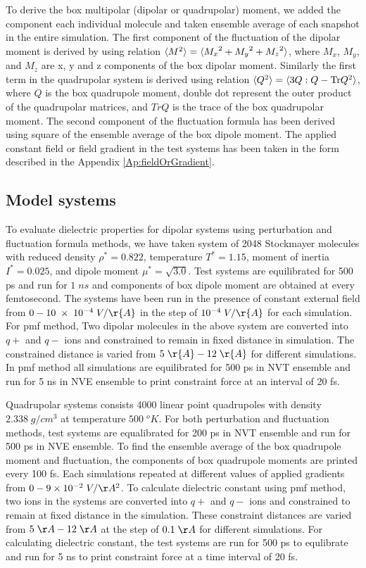 To derive the box multipolar (dipolar or quadrupolar) moment, we added the component each individual molecule and taken ensemble average of each snapshot in the entire simulation. The first component of the fluctuation of the dipolar moment is derived by using relation $\braket{M^2} = \braket{{M_x}^2 + {M_y}^2 + {M_z}^2}$, where $M_x$, $M_y$, and $M_z $ are x, y and z components of the box dipolar moment. Similarly the first term in the quadrupolar system is derived using relation $ \braket{Q^2} = \braket{3 Q:Q - \mathrm{Tr}Q^2} $, where $ Q $ is the box quadrupole moment, double dot represent the outer product of the quadrupolar matrices, and $TrQ$ is the trace of the box quadrupolar moment. The second component of the fluctuation formula has been derived using square of the ensemble average of the box dipole moment. The applied constant field or field gradient in the test systems has been taken in the form described in the Appendix \ref{Ap:fieldOrGradient}.

\subsection{Model systems}
To evaluate dielectric properties for dipolar systems using perturbation and fluctuation formula methods, we have taken system of 2048 Stockmayer molecules with reduced density $ \rho^* = 0.822$, temperature $T^* = 1.15 $, moment of inertia $I^* =  0.025 $, and dipole moment $ \mu^* = \sqrt{3.0} $. Test systems are equilibrated for 500 ps and run for $1\; ns$ and components of box dipole moment are obtained at every femtosecond. The systems have been run in the presence of constant external field from $ 0 - 10\; \times\; 10^{-4}\;V/{\r{A}}$ in the step of $ 10 ^{-4}\; V/\r{A}$ for each simulation. For pmf method, Two dipolar molecules in the above system are converted into $q+$ and $q-$ ions and constrained to remain in fixed distance in simulation. The constrained distance is varied from $5\;\r{A} - 12\; \r{A} $ for different simulations. In pmf method all simulations are equilibrated for 500 ps in NVT ensemble and run for 5 ns in NVE ensemble to print constraint force at an interval of 20 fs.   

Quadrupolar systems consists 4000 linear point quadrupoles with density $ 2.338\; g/cm^3$ at temperature $ 500\; ^oK $. For both perturbation and fluctuation methods, test systems are equalibrated for 200 ps in NVT ensemble and run for 500 ps in NVE ensemble. To find the ensemble average of the box quadrupole moment and fluctuation, the components of box quadrupole moments are printed every 100 fs. Each simulations repeated at different values of applied gradients from $ 0 - 9 \times 10^{-2}\; V/\AA^2 $. To calculate dielectric constant using pmf method, two ions in the systems are converted into $q+$ and $q-$ ions and constrained to remain at fixed distance in the simulation. These constraint distances are varied from $5\;\AA - 12\; \AA $ at the step of $0.1\; \AA $ for different simulations. For calculating dielectric constant, the test systems are run for 500 ps to equlibrate and run for 5 ns to print constraint force at a time interval of 20 fs.

